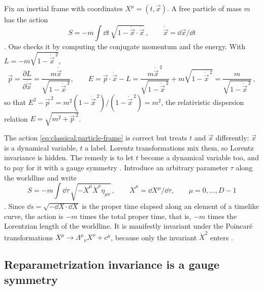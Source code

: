 Fix an inertial frame with coordinates $X^\mu=(t,\vec x)$. A free particle of mass $m$ has the
action
\begin{equation}\label{eq:classical:particle-frame}
  S=-m\int \dd t\,\sqrt{1-\dot{\vec x}\cdot\dot{\vec x}}\,,\qquad \dot{\vec x}=\dd\vec x/\dd t
\end{equation}
. One checks it by computing the conjugate momentum and the
energy. With $L=-m\sqrt{1-\dot{\vec x}^{\,2}}$,
\begin{equation}\label{eq:classical:particle-p}
  \vec p=\frac{\partial L}{\partial\dot{\vec x}}=\frac{m\dot{\vec x}}{\sqrt{1-\dot{\vec x}^{\,2}}},
  \qquad
  E=\vec p\cdot\dot{\vec x}-L=\frac{m\dot{\vec x}^{\,2}}{\sqrt{1-\dot{\vec x}^{\,2}}}+m\sqrt{1-\dot{\vec x}^{\,2}}
   =\frac{m}{\sqrt{1-\dot{\vec x}^{\,2}}}\,,
\end{equation}
so that $E^2-\vec p^{\,2}=m^2(1-\dot{\vec x}^{\,2})/(1-\dot{\vec x}^{\,2})=m^2$, the relativistic
dispersion relation $E=\sqrt{m^2+\vec p^{\,2}}$.

The action \eqref{eq:classical:particle-frame} is correct but treats $t$ and $\vec x$
differently: $\vec x$ is a dynamical variable, $t$ a label. Lorentz transformations mix them, so
Lorentz invariance is hidden. The remedy is to let $t$ become a dynamical variable too, and
to pay for it with a gauge symmetry . Introduce an
arbitrary parameter $\tau$ along the worldline and write
\begin{equation}\label{eq:classical:particle-cov}
  S=-m\int\dd\tau\,\sqrt{-\dot X^\mu\dot X^\nu\eta_{\mu\nu}}\,,\qquad \dot X^\mu=\dd X^\mu/\dd\tau,
  \qquad \mu=0,\dots,D-1
\end{equation}
. Since $\dd s=\sqrt{-\dd X\cdot\dd X}$ is the proper time
elapsed along an element of a timelike curve, the action is $-m$ times the total proper
time, that is, $-m$ times the Lorentzian length of the worldline. It is manifestly invariant
under the Poincar\'e transformations
$X^\mu\to\Lambda^\mu{}_\nu X^\nu+c^\mu$, because only the invariant $\dot X^2$ enters
.

\subsection{Reparametrization invariance is a gauge symmetry}


